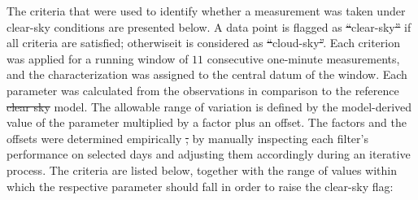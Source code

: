 \documentclass[applsci,article,accept,moreauthors,pdftex]{Definitions/mdpi} %
\providecommand{\DIFadd}[1]{{\protect\color{blue}\uwave{#1}}} %
\providecommand{\DIFdel}[1]{{\protect\color{red}\sout{#1}}}                      %
\providecommand{\DIFaddbegin}{} %
\providecommand{\DIFaddend}{} %
\providecommand{\DIFdelbegin}{} %
\providecommand{\DIFdelend}{} %
\begin{document}
The criteria that were used to identify whether a measurement was taken
under clear-sky conditions are presented below. A data point is flagged
as \DIFdelbegin \DIFdel{``}\DIFdelend \DIFaddbegin \DIFadd{`}\DIFaddend clear-sky\DIFdelbegin \DIFdel{'' }\DIFdelend \DIFaddbegin \DIFadd{' }\DIFaddend if all criteria are satisfied; otherwise\DIFaddbegin \DIFadd{, }\DIFaddend it is
considered as \DIFdelbegin \DIFdel{``}\DIFdelend \DIFaddbegin \DIFadd{`}\DIFaddend cloud-sky\DIFdelbegin \DIFdel{''}\DIFdelend \DIFaddbegin \DIFadd{'}\DIFaddend . Each criterion was applied for a running
window of \(11\) consecutive one-minute measurements, and the
characterization was assigned to the central datum of the window. Each
parameter was calculated from the observations in comparison to the
reference \DIFdelbegin \DIFdel{clear sky }\DIFdelend \DIFaddbegin \DIFadd{clear-sky }\DIFaddend model. The allowable range of variation is defined
by the model-derived value of the parameter multiplied by a factor plus
an offset. The factors and the offsets were determined empirically \DIFdelbegin \DIFdel{, }\DIFdelend by
manually inspecting each filter's performance on selected days and
adjusting them accordingly during an iterative process. The criteria are
listed below, together with the range of values within which the
respective parameter should fall in order to raise the clear-sky flag:
\end{document}
